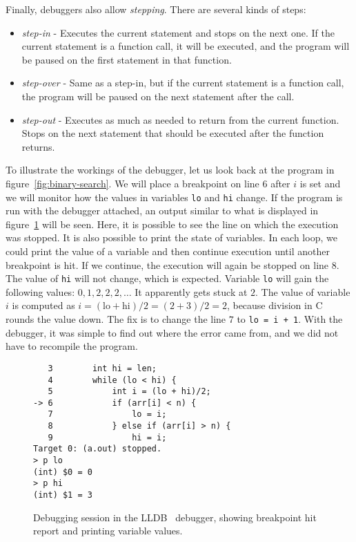 Finally, debuggers also allow \textit{stepping}. There are several kinds of
steps:
\begin{itemize}
    \item \textit{step-in} - Executes the current statement and stops on the
        next one. If the current statement is a function call, it will be
        executed, and the program will be paused on the first statement in that
        function.
    \item \textit{step-over} - Same as a step-in, but if the current statement
        is a function call, the program will be paused on the next statement
        after the call.
    \item \textit{step-out} - Executes as much as needed to return from the
        current function. Stops on the next statement that should be executed
        after the function returns.
\end{itemize}

To illustrate the workings of the debugger, let us look back at the program in
figure~\ref{fig:binary-search}. We will place a breakpoint on line $6$ after
$i$ is set and we will monitor how the values in variables \texttt{lo} and
\texttt{hi} change. If the program is run with the debugger attached, an output
similar to what is displayed in figure~\ref{fig:lldb-debug1} will be seen.
Here, it is possible to see the line on which the execution was stopped. It is
also possible to print the state of variables. In each loop, we could print the
value of a variable and then continue execution until another breakpoint is
hit. If we continue, the execution will again be stopped on line $8$. The value
of \texttt{hi} will not change, which is expected. Variable \texttt{lo} will
gain the following values: $0, 1, 2, 2, 2, \dots$ It apparently gets stuck at
$2$. The value of variable $i$ is computed as $i = (\text{lo} + \text{hi})/2 =
(2 + 3)/2 = 2$, because division in C rounds the value down. The fix is to
change the line $7$ to \texttt{lo = i + 1}. With the debugger, it was simple to
find out where the error came from, and we did not have to recompile the
program.

\begin{figure}
\begin{verbatim}
   3   	    int hi = len;
   4   	    while (lo < hi) {
   5   	        int i = (lo + hi)/2;
-> 6   	        if (arr[i] < n) {
   7   	            lo = i;
   8   	        } else if (arr[i] > n) {
   9   	            hi = i;
Target 0: (a.out) stopped.
> p lo
(int) $0 = 0
> p hi
(int) $1 = 3
\end{verbatim}
    \caption{Debugging session in the LLDB~\cite{lldb} debugger, showing
    breakpoint hit report and printing variable values.}
    \label{fig:lldb-debug1}
\end{figure}


